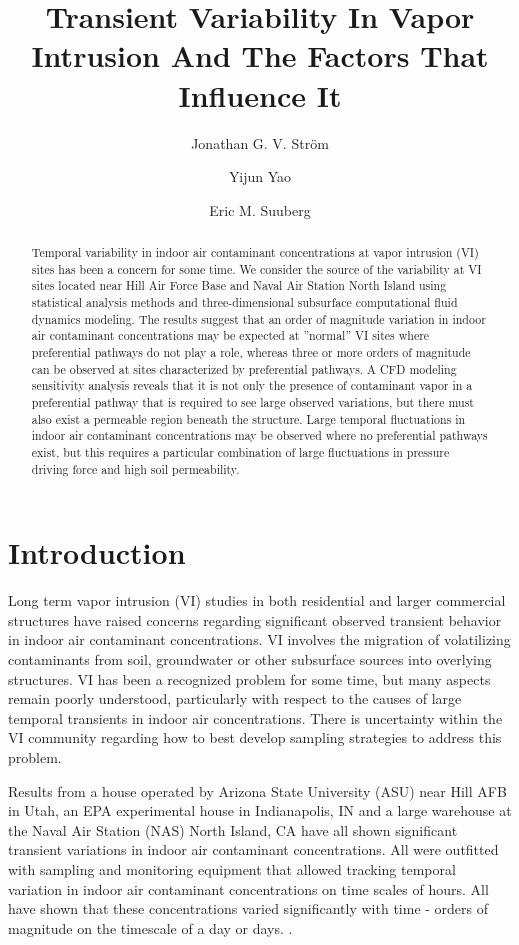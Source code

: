 \documentclass[journal=esthag,manuscript=article]{achemso}
\author{Jonathan G. V. Ström}
\affiliation[Brown University]{Brown University, School of Engineering, Providence, RI, USA}
\author{Yijun Yao}
\affiliation[Zhejiang University]{Zhejiang University, Hangzhou, China}
\author{Eric M. Suuberg}
\affiliation[Brown University]{Brown University, School of Engineering, Providence, RI, USA}
\title{Transient Variability In Vapor Intrusion And The Factors That Influence It}
\begin{document}
\begin{abstract}
Temporal variability in indoor air contaminant concentrations at vapor intrusion (VI) sites has been a concern for some time.
We consider the source of the variability at VI sites located near Hill Air Force Base and Naval Air Station North Island using statistical analysis methods and three-dimensional subsurface computational fluid dynamics modeling.
The results suggest that an order of magnitude variation in indoor air contaminant concentrations may be expected at ”normal” VI sites where preferential pathways do not play a role, whereas three or more orders of magnitude can be observed at sites characterized by preferential pathways.
A CFD modeling sensitivity analysis reveals that it is not only the presence of contaminant vapor in a preferential pathway that is required to see large observed variations, but there must also exist a permeable region beneath the structure.
Large temporal fluctuations in indoor air contaminant concentrations may be observed where no preferential pathways exist, but this requires a particular combination of large fluctuations in pressure driving force and high soil permeability.
\end{abstract}

\section{Introduction}

Long term vapor intrusion (VI) studies in both residential and larger commercial structures have raised concerns regarding significant observed transient behavior in indoor air contaminant concentrations\cite{u.s._environmental_protection_agency_oswer_2015,folkes_observed_2009,holton_temporal_2013,johnston_spatiotemporal_2014,hosangadi_high-frequency_2017,mchugh_recent_2017}.
VI involves the migration of volatilizing contaminants from soil, groundwater or other subsurface sources into overlying structures. VI has been a recognized problem for some time, but many aspects remain poorly understood, particularly with respect to the causes of large temporal transients in indoor air concentrations.
There is uncertainty within the VI community regarding how to best develop sampling strategies to address this problem\cite{u.s._environmental_protection_agency_oswer_2015,holton_temporal_2013,johnson_integrated_2016}. \par

Results from a house operated by Arizona State University (ASU) near Hill AFB in Utah, an EPA experimental house in Indianapolis, IN and a large warehouse at the Naval Air Station (NAS) North Island, CA have all shown significant transient variations in indoor air contaminant concentrations.
All were outfitted with sampling and monitoring equipment that allowed tracking temporal variation in indoor air contaminant concentrations on time scales of hours.
All have shown that these concentrations varied significantly with time - orders of magnitude on the timescale of a day or days.
\cite{holton_evaluation_2015,guo_vapor_2015,hosangadi_high-frequency_2017}. \par
\end{document}
